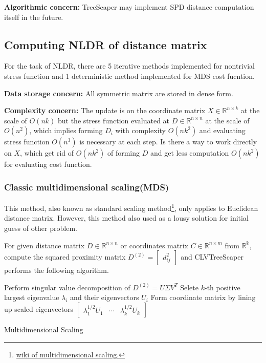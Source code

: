 \documentclass[11pt]{article}
\begin{document}
{\bf Algorithmic concern:} TreeScaper may implement SPD distance computation itself in the future.

\subsection{Computing NLDR of distance matrix}

For the task of NLDR, there are 5 iterative methods implemented for nontrivial stress function and 1 deterministic method implemented for MDS cost fucntion. 

{\bf Data storage concern:} All symmetric matrix are stored in dense form.

{\bf Complexity concern:} The update is on the coordinate matrix $X\in \mathbb{R}^{n\times k}$ at the scale of $O(nk)$ but the stress function evaluated at $D\in \mathbb{R}^{n\times n}$ at the scale of $O(n^2)$, which implies forming $D_i$ with complexity $O(nk^2)$ and evaluating stress function $O(n^3)$ is necessary at each step. Is there a way to work directly on $X$, which get rid of $O(nk^2)$ of forming $D$ and get less computation $O(nk^2)$ for evaluating cost function.

\subsubsection{Classic multidimensional scaling(MDS)} 

This method, also known as standard scaling method\footnote{\href{https://en.wikipedia.org/wiki/Multidimensional_scaling}{wiki of multidimensional scaling.}}, only applies to Euclidean distance matrix. However, this method also used as a lousy solution for initial guess of other problem.

For given distance matrix $D\in \mathbb{R}^{n\times n}$ or coordinates matrix $C\in \mathbb{R}^{n\times m}$ from $\mathbb{R^{k}}$, compute the squared proximity matrix $D^{(2)} = \begin{bmatrix}
	d^2_{ij}
\end{bmatrix}$ and CLVTreeScaper performs the following algorithm.
\begin{algorithm}[H]
    \DontPrintSemicolon
    Perform singular value decomposition of $D^{(2)}=U\Sigma V^T$\;
	Selete $k$-th positive largest eigenvalue $\lambda_i$ and their eigenvectors $U_i$\;
	Form coordinate matrix by lining up scaled eigenvectors $\begin{bmatrix}
		\lambda_1^{1/2}U_1&\cdots& \lambda_k^{1/2}U_k
	\end{bmatrix}$
    \caption{Multidimensional Scaling}
    \label{alg:MDS}
\end{algorithm}
\end{document}
